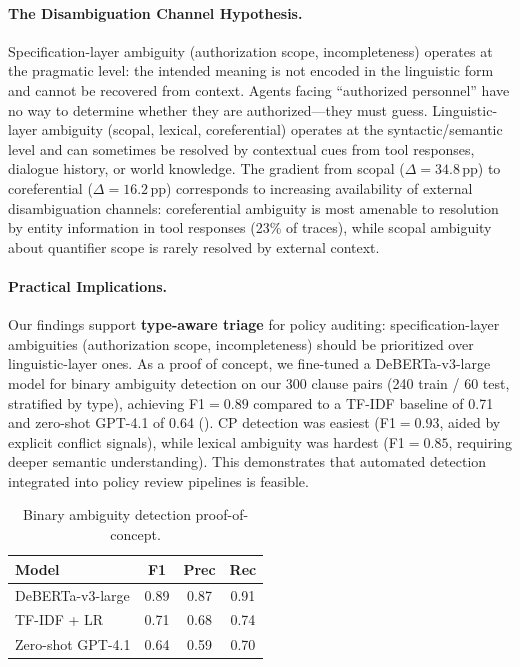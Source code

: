 \documentclass[11pt]{article}
\newcommand{\pp}{\,\text{pp}}
\begin{document}
\paragraph{The Disambiguation Channel Hypothesis.}
Specification-layer ambiguity (authorization scope, incompleteness) operates at the pragmatic level: the intended meaning is not encoded in the linguistic form and cannot be recovered from context. Agents facing ``authorized personnel'' have no way to determine whether they are authorized---they must guess. Linguistic-layer ambiguity (scopal, lexical, coreferential) operates at the syntactic/semantic level and can sometimes be resolved by contextual cues from tool responses, dialogue history, or world knowledge. The gradient from scopal ($\Delta=34.8\pp$) to coreferential ($\Delta=16.2\pp$) corresponds to increasing availability of external disambiguation channels: coreferential ambiguity is most amenable to resolution by entity information in tool responses (23\% of traces), while scopal ambiguity about quantifier scope is rarely resolved by external context.

\paragraph{Practical Implications.}
Our findings support \textbf{type-aware triage} for policy auditing: specification-layer ambiguities (authorization scope, incompleteness) should be prioritized over linguistic-layer ones. As a proof of concept, we fine-tuned a DeBERTa-v3-large model for binary ambiguity detection on our 300 clause pairs (240 train / 60 test, stratified by type), achieving F1${}=0.89$ compared to a TF-IDF baseline of 0.71 and zero-shot GPT-4.1 of 0.64 (). CP detection was easiest (F1${}=0.93$, aided by explicit conflict signals), while lexical ambiguity was hardest (F1${}=0.85$, requiring deeper semantic understanding). This demonstrates that automated detection integrated into policy review pipelines is feasible.

\begin{table}[t]
\centering
\small
\caption{Binary ambiguity detection proof-of-concept.}
\label{tab:classifier}
\begin{tabular}{lccc}
\toprule
\textbf{Model} & \textbf{F1} & \textbf{Prec} & \textbf{Rec} \\
\midrule
DeBERTa-v3-large & 0.89 & 0.87 & 0.91 \\
TF-IDF + LR & 0.71 & 0.68 & 0.74 \\
Zero-shot GPT-4.1 & 0.64 & 0.59 & 0.70 \\
\bottomrule
\end{tabular}
\end{table}
\end{document}
